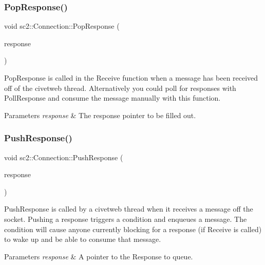 \subsubsection{\texorpdfstring{Pop\+Response()}{PopResponse()}}
{\footnotesize\ttfamily void sc2\+::\+Connection\+::\+Pop\+Response (\begin{DoxyParamCaption}\item[{S\+C2\+A\+P\+I\+Protocol\+::\+Response $\ast$\&}]{response }\end{DoxyParamCaption})}

Pop\+Response is called in the Receive function when a message has been received off of the civetweb thread. Alternatively you could poll for responses with Poll\+Response and consume the message manually with this function. 
\begin{DoxyParams}{Parameters}
{\em response} & The response pointer to be filled out. \\
\hline
\end{DoxyParams}
\mbox{\label{classsc2_1_1_connection_aad919078849b1b85b38db8d8d11c8004}} 
\subsubsection{\texorpdfstring{Push\+Response()}{PushResponse()}}
{\footnotesize\ttfamily void sc2\+::\+Connection\+::\+Push\+Response (\begin{DoxyParamCaption}\item[{S\+C2\+A\+P\+I\+Protocol\+::\+Response $\ast$\&}]{response }\end{DoxyParamCaption})}

Push\+Response is called by a civetweb thread when it receives a message off the socket. Pushing a response triggers a condition and enqueues a message. The condition will cause anyone currently blocking for a response (if Receive is called) to wake up and be able to consume that message. 
\begin{DoxyParams}{Parameters}
{\em response} & A pointer to the Response to queue. \\
\hline
\end{DoxyParams}
\mbox{\label{classsc2_1_1_connection_a383d7968897ccc2e35c2716bb110584f}} 
